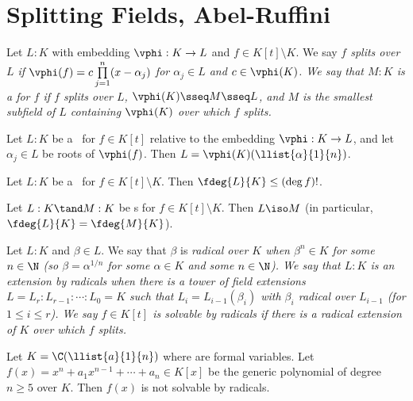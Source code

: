 \documentclass[a4paper]{article}
\begin{document}
\section{Splitting Fields, Abel-Ruffini}
\begin{tdefinition}
  Let \( L:K \) with embedding \( \vphi:K\to L \) and \( f\in K[t]\setminus K \).
  We say \it{\( f \) splits over \( L \)} if \( \vphi(f) = c\prod\limits_{j=1}^n (x-\alpha_j) \) for \( \alpha_j \in L \) and \( c\in \vphi(K) \).
  We say that \( M:K \) is a \it{\sfe} for \( f \) if \( f \) splits over \( L \), \( \vphi(K)\sseq M\sseq L \), and \( M \) is the smallest subfield of \( L \) containing \( \vphi(K) \) over which \( f \) splits.
\end{tdefinition}

\begin{tlemma}
  Let \( L:K \) be a \sfe~for \( f\in K[t] \) relative to the embedding \( \vphi:K\to L \), and let \( \alpha_j\in L \) be roots of \( \vphi(f) \).
  Then \( L=\vphi(K)(\llist{\alpha}{1}{n}) \).
\end{tlemma}

\begin{tlemma}
  Let \( L:K \) be a \sfe~for \( f\in K[t]\setminus K \).
  Then \( \fdeg{L}{K}\leq (\deg f)! \).
\end{tlemma}

\begin{tlemma}
  Let \( L:K \tand M:K \) be  \sfe s for \( f\in K[t]\setminus K \).
  Then \( L\iso M \) (in particular, \( \fdeg{L}{K}=\fdeg{M}{K} \)).
\end{tlemma}

\begin{tdefinition}
  Let \( L:K \) and \( \beta \in L \).
  We say that \( \beta \) is \it{radical} over \( K \) when \( \beta^n \in K \) for some \( n \in \N \) (so \( \beta = \alpha^{1/n} \) for some \( \alpha \in K \) and some \( n \in \N \)).
  We say that \( L:K \) is \it{an extension by radicals} when there is a tower of field extensions \( L = L_r : L_{r-1} : \cdots : L_0 = K \) such that \( L_i = L_{i-1}(\beta_i) \) with \( \beta_i \) radical over \( L_{i-1} \) (for \( 1 \leq i \leq r \)).
  We say \( f \in K[t] \) is \it{solvable by radicals} if there is a radical extension of \( K \) over which \( f \) splits.
\end{tdefinition}

\begin{ttheorem}
  Let \( K=\C(\llist{a}{1}{n}) \) where  are formal variables.
  Let \( f(x) = x^n+a_1x^{n-1}+\cdots+a_n \in K[x] \) be the generic polynomial of degree \( n\geq 5 \) over \( K \).
  Then \( f(x) \) is not solvable by radicals.
\end{ttheorem}
\end{document}
